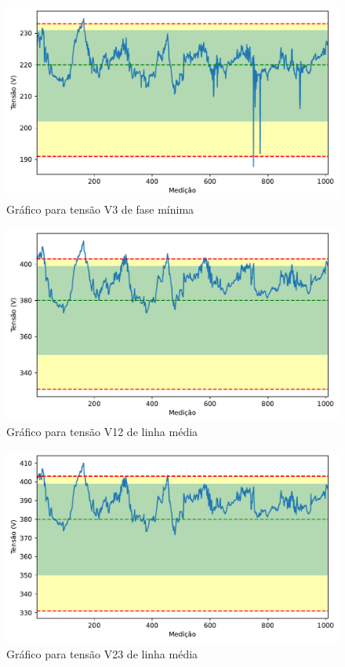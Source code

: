 \begin{figure}[H]
	\centering
	\caption{Gráfico para tensão V3 de fase mínima}
    \includegraphics[width=16cm]{illustrations/figures/a1_V3_Min.pdf}
\end{figure}

\begin{figure}[H]
	\centering
	\caption{Gráfico para tensão V12 de linha média}
    \includegraphics[width=16cm]{illustrations/figures/a1_V12_Avg.pdf}
\end{figure}

\begin{figure}[H]
	\centering
	\caption{Gráfico para tensão V23 de linha média}
    \includegraphics[width=16cm]{illustrations/figures/a1_V23_Avg.pdf}
\end{figure}

